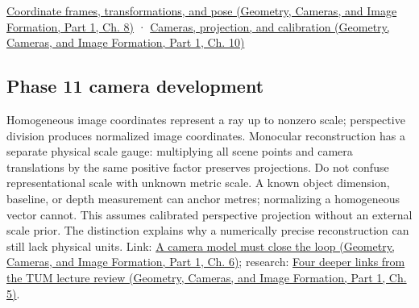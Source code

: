 \href{../03-Geometry-Cameras-and-Image-Formation-P01/main.pdf\#03-visual-computing-i-ch001-coordinate-frames-transformations-and-pose}{Coordinate frames, transformations, and pose (Geometry, Cameras, and Image Formation, Part 1, Ch. 8)} · \href{../03-Geometry-Cameras-and-Image-Formation-P01/main.pdf\#03-visual-computing-i-ch003-cameras-projection-and-calibration}{Cameras, projection, and calibration (Geometry, Cameras, and Image Formation, Part 1, Ch. 10)}

\subsection{Phase 11 camera development}\label{appendix-cb3b26862282-phase-11-camera-development}

\hypertarget{appendix-cb3b26862282-phase-11-camera-development}{}

Homogeneous image coordinates represent a ray up to nonzero scale; perspective division produces normalized image coordinates. Monocular reconstruction has a separate physical scale gauge: multiplying all scene points and camera translations by the same positive factor preserves projections. Do not confuse representational scale with unknown metric scale. A known object dimension, baseline, or depth measurement can anchor metres; normalizing a homogeneous vector cannot. This assumes calibrated perspective projection without an external scale prior. The distinction explains why a numerically precise reconstruction can still lack physical units. Link: \href{../03-Geometry-Cameras-and-Image-Formation-P01/main.pdf\#02-foundations-ii-ch037-a-camera-model-must-close-the-loop}{A camera model must close the loop (Geometry, Cameras, and Image Formation, Part 1, Ch. 6)}; research: \href{../03-Geometry-Cameras-and-Image-Formation-P01/main.pdf\#02-foundations-ii-ch036-four-deeper-links-from-the-tum-lecture-review}{Four deeper links from the TUM lecture review (Geometry, Cameras, and Image Formation, Part 1, Ch. 5)}.
